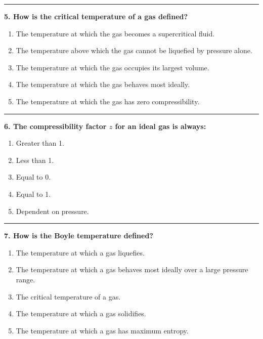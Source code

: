 \documentclass[
  9pt,
]{extbook}
\providecommand{\tightlist}{%
  \setlength{\itemsep}{0pt}\setlength{\parskip}{0pt}}
\theoremstyle{definition}
\theoremstyle{definition}
\theoremstyle{definition}
\theoremstyle{definition}
\theoremstyle{remark}
\begin{document}
\begin{center}\rule{0.5\linewidth}{0.5pt}\end{center}

\textbf{5. How is the critical temperature of a gas defined?}

\begin{enumerate}
\def\labelenumi{\alph{enumi}.}
\tightlist
\item
  The temperature at which the gas becomes a supercritical fluid.
\item
  The temperature above which the gas cannot be liquefied by pressure alone.
\item
  The temperature at which the gas occupies its largest volume.
\item
  The temperature at which the gas behaves most ideally.
\item
  The temperature at which the gas has zero compressibility.
\end{enumerate}

\begin{center}\rule{0.5\linewidth}{0.5pt}\end{center}

\textbf{6. The compressibility factor \(z\) for an ideal gas is always:}

\begin{enumerate}
\def\labelenumi{\alph{enumi}.}
\tightlist
\item
  Greater than 1.
\item
  Less than 1.
\item
  Equal to 0.
\item
  Equal to 1.
\item
  Dependent on pressure.
\end{enumerate}

\begin{center}\rule{0.5\linewidth}{0.5pt}\end{center}

\textbf{7. How is the Boyle temperature defined?}

\begin{enumerate}
\def\labelenumi{\alph{enumi}.}
\tightlist
\item
  The temperature at which a gas liquefies.
\item
  The temperature at which a gas behaves most ideally over a large pressure range.
\item
  The critical temperature of a gas.
\item
  The temperature at which a gas solidifies.
\item
  The temperature at which a gas has maximum entropy.
\end{enumerate}
\end{document}
